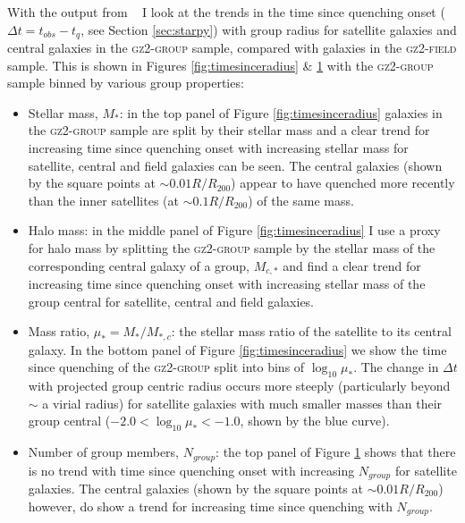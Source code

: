 \begin{figure}
{\label{fig:timesinceradiusvel}}
\end{figure}


With the output from \starpy~ I look at the trends in the time since quenching onset ($\Delta t = t_{obs} - t_{q}$, see Section \ref{sec:starpy}) with group radius for satellite galaxies and central galaxies in the \textsc{gz2-group} sample, compared with galaxies in the \textsc{gz2-field} sample. This is shown in Figures \ref{fig:timesinceradius} \& \ref{fig:timesinceradiusvel} with the \textsc{gz2-group} sample binned by various group properties:
\begin{itemize}

\item{Stellar mass, $M_*$: in the top panel of Figure \ref{fig:timesinceradius} galaxies in the \textsc{gz2-group} sample are split by their stellar mass and a clear trend for increasing time since quenching onset with increasing stellar mass for satellite, central and field galaxies can be seen. The central galaxies (shown by the square points at $\sim 0.01 R/R_{200}$) appear to have quenched more recently than the inner satellites (at $\sim0.1R/R_{200}$) 
of the same mass.}

\item{Halo mass: in the middle panel of Figure \ref{fig:timesinceradius} I use a proxy for halo mass by splitting the \textsc{gz2-group} sample by the stellar mass of the corresponding central galaxy of a group, $M_{c,*}$ and find a clear trend for increasing time since quenching onset with increasing stellar mass of the group central for satellite, central and field galaxies.}

\item{Mass ratio, $\mu_* = M_*/M_{*,c}$: the stellar mass ratio of the satellite to its central galaxy. In the bottom panel of Figure \ref{fig:timesinceradius} we show the time since quenching of the \textsc{gz2-group} split into bins of $\log_{10}\mu_*$. The change in $\Delta t $ with projected group centric radius occurs more steeply (particularly beyond $\sim$ a virial radius) for satellite galaxies with much smaller masses than their group central ($-2.0 < \log_{10}\mu_* < -1.0$, shown by the blue curve).}

\item{Number of group members, $N_{group}$: the top panel of Figure \ref{fig:timesinceradiusvel} shows that there is no trend with time since quenching onset with increasing $N_{group}$ for satellite galaxies. The central galaxies (shown by the square points at $\sim 0.01 R/R_{200}$) however, do show a trend for increasing time since quenching with $N_{group}$.}


\end{itemize}
